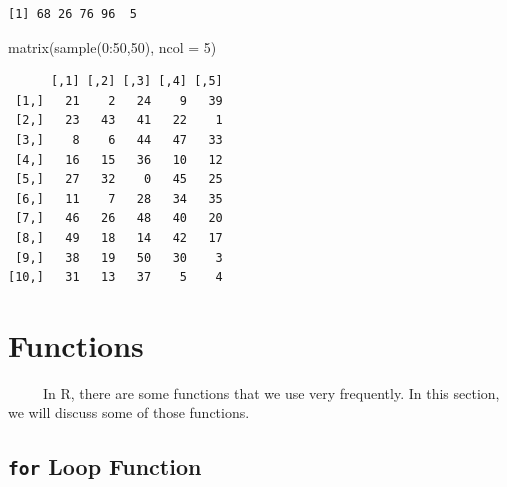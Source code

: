 \documentclass[
  letterpaper,
  DIV=11,
  numbers=noendperiod]{scrreprt}
\newenvironment{Shaded}{\begin{snugshade}}{\end{snugshade}}
\newcommand{\AttributeTok}[1]{\textcolor[rgb]{0.40,0.45,0.13}{#1}}
\newcommand{\DecValTok}[1]{\textcolor[rgb]{0.68,0.00,0.00}{#1}}
\newcommand{\FunctionTok}[1]{\textcolor[rgb]{0.28,0.35,0.67}{#1}}
\newcommand{\NormalTok}[1]{\textcolor[rgb]{0.00,0.23,0.31}{#1}}
\newcommand{\SpecialCharTok}[1]{\textcolor[rgb]{0.37,0.37,0.37}{#1}}
\begin{document}
\begin{verbatim}
[1] 68 26 76 96  5
\end{verbatim}

\begin{Shaded}
\begin{Highlighting}[]
\FunctionTok{matrix}\NormalTok{(}\FunctionTok{sample}\NormalTok{(}\DecValTok{0}\SpecialCharTok{:}\DecValTok{50}\NormalTok{,}\DecValTok{50}\NormalTok{), }\AttributeTok{ncol =} \DecValTok{5}\NormalTok{)}
\end{Highlighting}
\end{Shaded}

\begin{verbatim}
      [,1] [,2] [,3] [,4] [,5]
 [1,]   21    2   24    9   39
 [2,]   23   43   41   22    1
 [3,]    8    6   44   47   33
 [4,]   16   15   36   10   12
 [5,]   27   32    0   45   25
 [6,]   11    7   28   34   35
 [7,]   46   26   48   40   20
 [8,]   49   18   14   42   17
 [9,]   38   19   50   30    3
[10,]   31   13   37    5    4
\end{verbatim}

\section{Functions}\label{functions}

~~~~~In R, there are some functions that we use very frequently. In this
section, we will discuss some of those functions.

\subsection{\texorpdfstring{\texttt{for} Loop
Function}{for Loop Function}}\label{for-loop-function-1}
\end{document}
